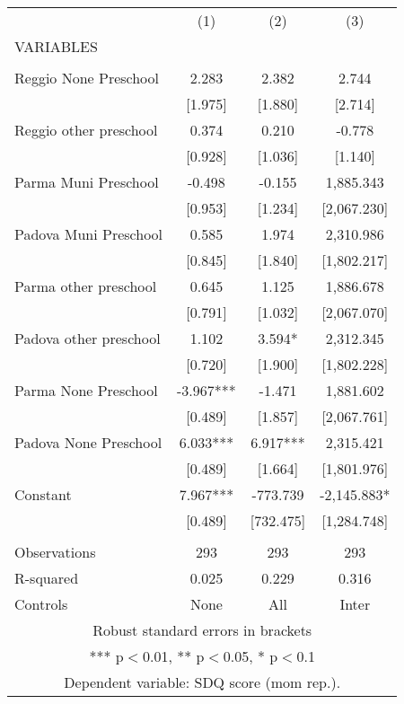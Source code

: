 \begin{tabular}{lccc} \hline
 & (1) & (2) & (3) \\
VARIABLES &  &  &  \\ \hline
 &  &  &  \\
Reggio None Preschool & 2.283 & 2.382 & 2.744 \\
 & [1.975] & [1.880] & [2.714] \\
Reggio other preschool & 0.374 & 0.210 & -0.778 \\
 & [0.928] & [1.036] & [1.140] \\
Parma Muni Preschool & -0.498 & -0.155 & 1,885.343 \\
 & [0.953] & [1.234] & [2,067.230] \\
Padova Muni Preschool & 0.585 & 1.974 & 2,310.986 \\
 & [0.845] & [1.840] & [1,802.217] \\
Parma other preschool & 0.645 & 1.125 & 1,886.678 \\
 & [0.791] & [1.032] & [2,067.070] \\
Padova other preschool & 1.102 & 3.594* & 2,312.345 \\
 & [0.720] & [1.900] & [1,802.228] \\
Parma None Preschool & -3.967*** & -1.471 & 1,881.602 \\
 & [0.489] & [1.857] & [2,067.761] \\
Padova None Preschool & 6.033*** & 6.917*** & 2,315.421 \\
 & [0.489] & [1.664] & [1,801.976] \\
Constant & 7.967*** & -773.739 & -2,145.883* \\
 & [0.489] & [732.475] & [1,284.748] \\
 &  &  &  \\
Observations & 293 & 293 & 293 \\
R-squared & 0.025 & 0.229 & 0.316 \\
 Controls & None & All & Inter \\ \hline
\multicolumn{4}{c}{ Robust standard errors in brackets} \\
\multicolumn{4}{c}{ *** p$<$0.01, ** p$<$0.05, * p$<$0.1} \\
\multicolumn{4}{c}{ Dependent variable: SDQ score (mom rep.).} \\
\end{tabular}
